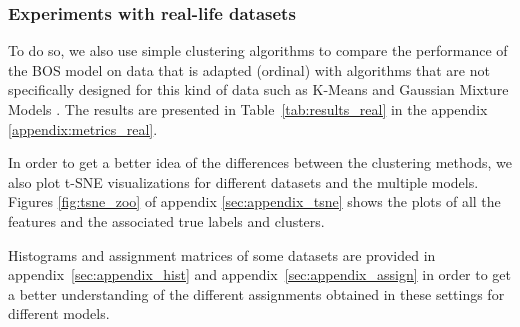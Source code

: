\subsubsection{Experiments with real-life datasets}
To do so, we also use simple clustering algorithms to compare the performance of the BOS model on data that is adapted (ordinal) with algorithms that are not specifically designed for this kind of data such as K-Means \citep{macqueen1967some} and Gaussian Mixture Models \citep{reynolds2009gaussian}.
The results are presented in Table~\ref{tab:results_real} in the appendix \ref{appendix:metrics_real}.

In order to get a better idea of the differences between the clustering methods, we also plot t-SNE visualizations \citep{van2008visualizing} for different datasets and the multiple models. Figures \ref{fig:tsne_zoo} of appendix \ref{sec:appendix_tsne} shows the plots of all the features and the associated true labels and clusters.

Histograms and assignment matrices of some datasets are provided in appendix~\ref{sec:appendix_hist} and appendix~\ref{sec:appendix_assign} in order to get a better understanding of the different assignments obtained in these settings for different models.






